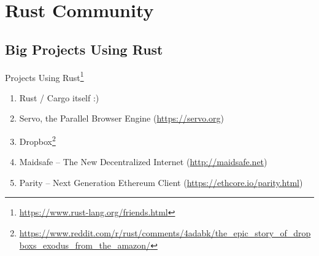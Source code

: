 \section{Rust Community}

\subsection{Big Projects Using Rust}

\begin{frame}{Projects Using Rust\footnote{\url{https://www.rust-lang.org/friends.html}}}
\begin{enumerate}
\item Rust / Cargo itself :)
\item Servo, the Parallel Browser Engine (\url{https://servo.org})
\item Dropbox\footnote{\url{https://www.reddit.com/r/rust/comments/4adabk/the_epic_story_of_dropboxs_exodus_from_the_amazon/}}
\item Maidsafe -- The New Decentralized Internet (\url{http://maidsafe.net})
\item Parity -- Next Generation Ethereum Client (\url{https://ethcore.io/parity.html})
\end{enumerate}
\end{frame}

